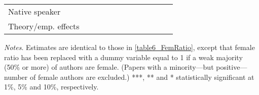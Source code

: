 \begin{sidewaystable}
\begin{threeparttable}
\begin{tabular}{p{3cm}S@{}S@{}S@{}S@{}S@{}S@{}S@{}S@{}S@{}S@{}S@{}}
            Native speaker                &               &           {}   &               &           {}   &               &           {}   &               &           {}   &               &               &               \\
            Theory/emp. effects           &               &           {}   &               &           {}   &               &           {}   &               &           {}   &               &               &               \\
            \bottomrule
        \end{tabular}
        \begin{tablenotes}
            \tiny
            \item \textit{Notes}. Estimates are identical to those in \autoref{table6_FemRatio}, except that female ratio has been replaced with a dummy variable equal to 1 if a weak majority (50\% or more) of authors are female. (Papers with a minority---but positive---number of female authors are excluded.) ***, ** and * statistically significant at 1\%, 5\% and 10\%, respectively.
        \end{tablenotes}
    \end{threeparttable}

\end{sidewaystable}
